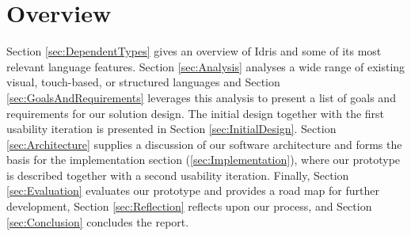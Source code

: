 \section{Overview}
Section \ref{sec:DependentTypes} gives an overview of Idris and some of its
most relevant language features. Section \ref{sec:Analysis} analyses a
wide range of existing visual, touch-based, or structured languages and Section
\ref{sec:GoalsAndRequirements} leverages this analysis to present a list of
goals and requirements for our solution design. The initial design together with the first usability
iteration is presented in Section \ref{sec:InitialDesign}. Section \ref{sec:Architecture}
supplies a discussion of our software architecture and forms the basis for the
implementation section (\ref{sec:Implementation}), where our prototype is
described together with a second usability iteration. Finally, Section \ref{sec:Evaluation}
evaluates our prototype and provides a road map for further development, Section \ref{sec:Reflection} reflects
upon our process, and Section \ref{sec:Conclusion} concludes the report.




